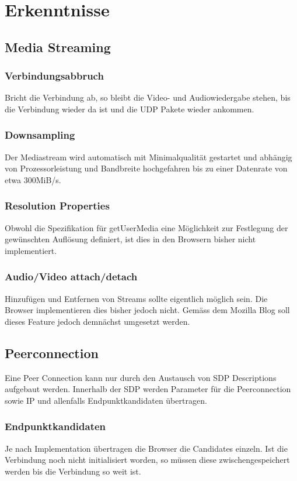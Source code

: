 \chapter{Erkenntnisse}
	\section{Media Streaming}
		\subsection{Verbindungsabbruch}
			Bricht die Verbindung ab, so bleibt die Video- und Audiowiedergabe stehen, bis die Verbindung wieder da ist und die UDP Pakete wieder ankommen.
		
		\subsection{Downsampling}
	 		Der Mediastream wird automatisch mit Minimalqualität gestartet und abhängig von Prozessorleistung und Bandbreite hochgefahren bis zu einer Datenrate von etwa 300MiB/s.
	 		
	 	\subsection{Resolution Properties}
	 		Obwohl die Spezifikation für getUserMedia eine Möglichkeit zur Festlegung der gewünschten Auflösung definiert, ist dies in den Browsern bisher nicht implementiert.
	 		
	 	\subsection{Audio/Video attach/detach}
	 		Hinzufügen und Entfernen von Streams sollte eigentlich möglich sein. Die Browser implementieren dies bisher jedoch nicht. Gemäss dem Mozilla Blog soll dieses Feature jedoch demnächst umgesetzt werden.	 	
	 	
	 \section{Peerconnection}
	 	Eine Peer Connection kann nur durch den Austausch von SDP Descriptions aufgebaut werden. Innerhalb der SDP werden Parameter für die Peerconnection sowie IP und allenfalls Endpunktkandidaten übertragen. 
	 	
	 	\subsection{Endpunktkandidaten}
	 	Je nach Implementation übertragen die Browser die Candidates einzeln. Ist die Verbindung noch nicht initialisiert worden, so müssen diese zwischengespeichert werden bis die Verbindung so weit ist.

